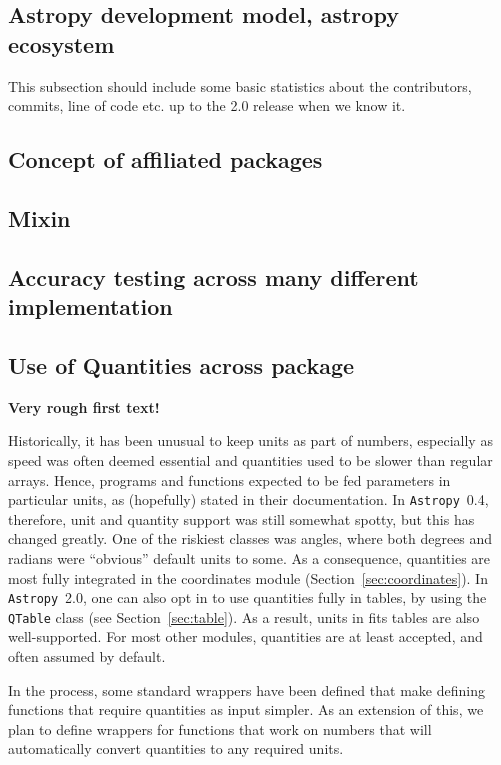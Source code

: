 \documentclass[modern]{aastex61}
\newcommand{\package}[1]{\texttt{#1}}
\newcommand{\astropypkg}{\package{Astropy}}
\newcommand{\sectionname}{Section}
\begin{document}
\subsection{Astropy development model, astropy ecosystem}
This subsection should include some basic statistics about the contributors, commits, line of code etc. up to the 2.0 release when we know it.

\subsection{Concept of affiliated packages}

\subsection{Mixin}

\subsection{Accuracy testing across many different implementation}

\subsection{Use of Quantities across package}

{\bf Very rough first text!}

Historically, it has been unusual to keep units as part of numbers, especially as speed was often deemed essential and quantities used to be slower than regular arrays. Hence, programs and functions expected to be fed parameters in particular units, as (hopefully) stated in their documentation.  In \astropypkg\ 0.4, therefore, unit and quantity support was still somewhat spotty, but this has changed greatly.  One of the riskiest classes was angles, where both degrees and radians were ``obvious'' default units to some. As a consequence, quantities are most fully integrated in the coordinates module (\sectionname~\ref{sec:coordinates}). In \astropypkg\ 2.0, one can also opt in to use quantities fully in tables, by using the {\tt QTable} class (see \sectionname~\ref{sec:table}). As a result, units in fits tables are also well-supported. For most other modules, quantities are at least accepted, and often assumed by default.

In the process, some standard wrappers have been defined that make defining functions that require quantities as input simpler. As an extension of this, we plan to define wrappers for functions that work on numbers that will automatically convert quantities to any required units.
\end{document}
